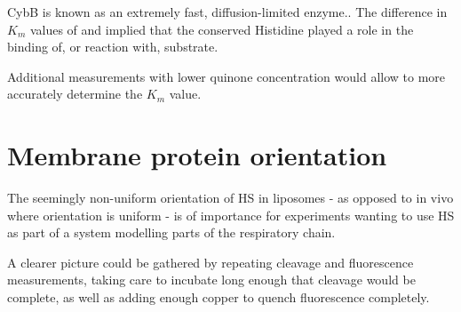 CybB is known as an extremely fast, diffusion-limited
enzyme.\cite{superoxide_salvaging}. The difference in $K_m$ values of \hsmut{}
and \hs{} implied that the conserved Histidine played a role in the binding of,
or reaction with, substrate.

Additional measurements with lower quinone concentration would allow to more
accurately determine the $K_m$ value.

\section{Membrane protein orientation}

The seemingly non-uniform orientation of HS in liposomes - as opposed to in
vivo where orientation is uniform - is of importance for experiments wanting to
use HS as part of a system modelling parts of the respiratory chain.

A clearer picture could be gathered by repeating cleavage and fluorescence
measurements, taking care to incubate long enough that cleavage would be
complete, as well as adding enough copper to quench fluorescence completely.

